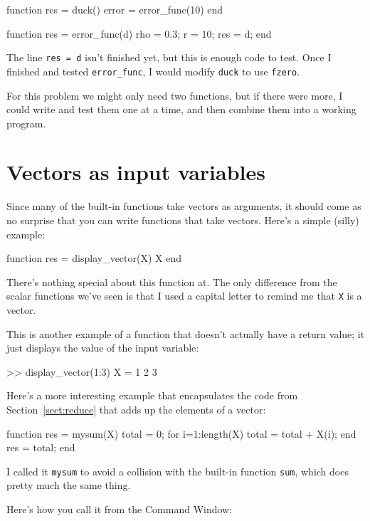 \documentclass[
]{book}
\numberwithin{Answer}{chapter}
\numberwithin{Exercise}{chapter}
\begin{document}
\begin{code}
function res = duck()
    error = error_func(10)
end

function res = error_func(d)
    rho = 0.3;      %
    r = 10;         %
    res = d;
end
\end{code}

The line {\tt res = d} isn't finished yet, but this
is enough code to test.
Once I finished and tested {\tt error\_func}, I would modify
{\tt duck} to use {\tt fzero}.

For this problem we might only need two functions, but if there
were more, I could write and test them one at a time, and then
combine them into a working program.


\section{Vectors as input variables}

Since many of the built-in functions take vectors as arguments,
it should come as no surprise that you can write functions that
take vectors.  Here's a simple (silly) example:

\begin{code}
function res = display_vector(X)
    X
end
\end{code}

There's nothing special about this function at.  The only
difference from the scalar functions we've seen is that I used
a capital letter to remind me that {\tt X} is a vector.

This is another example of a function that doesn't actually have
a return value; it just displays the value of the input variable:

\begin{code}
>> display_vector(1:3)
X = 1     2     3
\end{code}

Here's a more interesting example that encapsulates the code
from Section~\ref{sect:reduce} that adds up the elements of a vector:

\begin{code}
function res = mysum(X)
    total = 0;
    for i=1:length(X)
        total = total + X(i);
    end
    res = total;
end
\end{code}

I called it {\tt mysum} to avoid a collision with the built-in
function {\tt sum}, which does pretty much the same thing.

Here's how you call it from the {\sf Command Window}:
\end{document}
